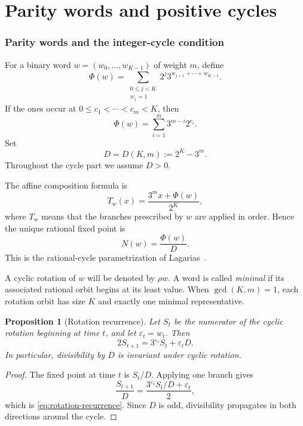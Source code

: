 \documentclass[11pt]{amsart}
\numberwithin{equation}{section}
\newtheorem{proposition}[theorem]{Proposition}
\newcommand{\eps}{\varepsilon}
\begin{document}
\part{Parity words and positive cycles}

\section{Parity words and the integer-cycle condition}

For a binary word $w=(w_0,\ldots,w_{K-1})$ of weight $m$, define
\begin{equation}\label{eq:Phi-def}
\Phi(w)=\sum_{\substack{0\le j<K\\w_j=1}}2^j3^{w_{j+1}+\cdots+w_{K-1}}.
\end{equation}
If the ones occur at $0\le c_1<\cdots<c_m<K$, then
\begin{equation}\label{eq:Phi-ci}
\Phi(w)=\sum_{i=1}^m3^{m-i}2^{c_i}.
\end{equation}
Set
\[
D=D(K,m):=2^K-3^m.
\]
Throughout the cycle part we assume $D>0$.

The affine composition formula is
\begin{equation}\label{eq:affine-composition}
T_w(x)=\frac{3^m x+\Phi(w)}{2^K},
\end{equation}
where $T_w$ means that the branches prescribed by $w$ are applied in order.  Hence the unique rational fixed point is
\begin{equation}\label{eq:rational-fixed}
N(w)=\frac{\Phi(w)}{D}.
\end{equation}
This is the rational-cycle parametrization of Lagarias~\cite[Theorem~2.1]{Lagarias1990}.

A cyclic rotation of $w$ will be denoted by $\rho w$.  A word is called \emph{minimal} if its associated rational orbit begins at its least value.  When $\gcd(K,m)=1$, each rotation orbit has size $K$ and exactly one minimal representative.

\begin{proposition}[Rotation recurrence]\label{prop:rotation-recurrence}
Let $S_t$ be the numerator of the cyclic rotation beginning at time $t$, and let $\eps_t=w_t$.  Then
\begin{equation}\label{eq:rotation-recurrence}
2S_{t+1}=3^{\eps_t}S_t+\eps_tD.
\end{equation}
In particular, divisibility by $D$ is invariant under cyclic rotation.
\end{proposition}

\begin{proof}
The fixed point at time $t$ is $S_t/D$.  Applying one branch gives
\[
\frac{S_{t+1}}D=\frac{3^{\eps_t}S_t/D+\eps_t}{2},
\]
which is \eqref{eq:rotation-recurrence}.  Since $D$ is odd, divisibility propagates in both directions around the cycle.
\end{proof}
\end{document}
